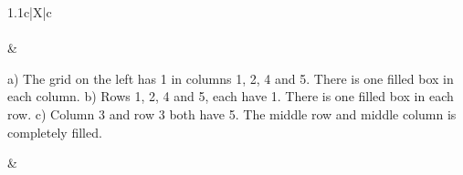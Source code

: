 \documentclass[a4paper]{exam}
\begin{document}
\begin{questions}
\begin{tabularx}{1.1\linewidth}{c|X|c}
  \\\hline
  \\
  &
  {\footnotesize

    a) The grid on the left has 1 in columns 1, 2, 4 and 5. There is one filled box in each column.\newline
    b) Rows 1, 2, 4 and 5, each have 1. There is one filled box in each row.\newline
    c) Column 3 and row 3 both have 5. The middle row and middle column is completely filled.}
  &
  \\\hline  
\end{tabularx}


\end{questions}
\end{document}
